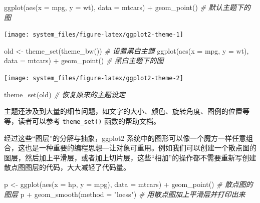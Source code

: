 \documentclass[
  b5paper,
  UTF8,twoside]{book}
\newenvironment{Shaded}{\begin{snugshade}}{\end{snugshade}}
\newcommand{\AttributeTok}[1]{\textcolor[rgb]{0.77,0.63,0.00}{#1}}
\newcommand{\CommentTok}[1]{\textcolor[rgb]{0.56,0.35,0.01}{\textit{#1}}}
\newcommand{\FunctionTok}[1]{\textcolor[rgb]{0.00,0.00,0.00}{#1}}
\newcommand{\NormalTok}[1]{#1}
\newcommand{\OtherTok}[1]{\textcolor[rgb]{0.56,0.35,0.01}{#1}}
\newcommand{\SpecialCharTok}[1]{\textcolor[rgb]{0.00,0.00,0.00}{#1}}
\newcommand{\StringTok}[1]{\textcolor[rgb]{0.31,0.60,0.02}{#1}}
\begin{document}
\begin{Shaded}
\begin{Highlighting}[]
\FunctionTok{ggplot}\NormalTok{(}\FunctionTok{aes}\NormalTok{(}\AttributeTok{x =}\NormalTok{ mpg, }\AttributeTok{y =}\NormalTok{ wt), }\AttributeTok{data =}\NormalTok{ mtcars) }\SpecialCharTok{+}
  \FunctionTok{geom\_point}\NormalTok{() }\CommentTok{\# 默认主题下的图}
\end{Highlighting}
\end{Shaded}

\begin{center}\texttt{[image: system\_files/figure-latex/ggplot2-theme-1]} \end{center}

\begin{Shaded}
\begin{Highlighting}[]
\NormalTok{old }\OtherTok{\textless{}{-}} \FunctionTok{theme\_set}\NormalTok{(}\FunctionTok{theme\_bw}\NormalTok{()) }\CommentTok{\# 设置黑白主题}
\FunctionTok{ggplot}\NormalTok{(}\FunctionTok{aes}\NormalTok{(}\AttributeTok{x =}\NormalTok{ mpg, }\AttributeTok{y =}\NormalTok{ wt), }\AttributeTok{data =}\NormalTok{ mtcars) }\SpecialCharTok{+}
  \FunctionTok{geom\_point}\NormalTok{() }\CommentTok{\# 黑白主题下的图}
\end{Highlighting}
\end{Shaded}

\begin{center}\texttt{[image: system\_files/figure-latex/ggplot2-theme-2]} \end{center}

\begin{Shaded}
\begin{Highlighting}[]
\FunctionTok{theme\_set}\NormalTok{(old) }\CommentTok{\# 恢复原来的主题设定}
\end{Highlighting}
\end{Shaded}

主题还涉及到大量的细节问题，如文字的大小、颜色、旋转角度、图例的位置等等，读者可以参考 \texttt{theme\_set()} 函数的帮助文档。

经过这些``图层''的分解与抽象，ggplot2 系统中的图形可以像一个魔方一样任意组合，这也是一种重要的编程思想---让对象可重用。例如我们可以创建一个散点图的图层，然后加上平滑层，或者加上切片层，这些``相加''的操作都不需要重新写创建散点图图层的代码，大大减轻了代码量。

\begin{Shaded}
\begin{Highlighting}[]
\NormalTok{p }\OtherTok{\textless{}{-}} \FunctionTok{ggplot}\NormalTok{(}\FunctionTok{aes}\NormalTok{(}\AttributeTok{x =}\NormalTok{ hp, }\AttributeTok{y =}\NormalTok{ mpg), }\AttributeTok{data =}\NormalTok{ mtcars) }\SpecialCharTok{+}
  \FunctionTok{geom\_point}\NormalTok{() }\CommentTok{\# 散点图的图层}
\NormalTok{p }\SpecialCharTok{+} \FunctionTok{geom\_smooth}\NormalTok{(}\AttributeTok{method =} \StringTok{"loess"}\NormalTok{) }\CommentTok{\# 用散点图加上平滑层并打印出来}
\end{Highlighting}
\end{Shaded}
\end{document}
